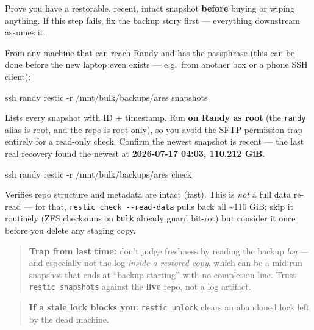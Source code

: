 \documentclass[
]{article}
\newenvironment{Shaded}{\begin{snugshade}}{\end{snugshade}}
\newcommand{\FunctionTok}[1]{\textcolor[rgb]{0.00,0.00,0.00}{#1}}
\newcommand{\NormalTok}[1]{#1}
\newcommand{\StringTok}[1]{\textcolor[rgb]{0.31,0.60,0.02}{#1}}
\begin{document}
Prove you have a restorable, recent, intact snapshot \textbf{before}
buying or wiping anything. If this step fails, fix the backup story
first --- everything downstream assumes it.

From any machine that can reach Randy and has the passphrase (this can
be done before the new laptop even exists --- e.g.~from another box or a
phone SSH client):

\begin{Shaded}
\begin{Highlighting}[]
\FunctionTok{ssh}\NormalTok{ randy }\StringTok{\textquotesingle{}restic {-}r /mnt/bulk/backups/ares snapshots\textquotesingle{}}
\end{Highlighting}
\end{Shaded}

Lists every snapshot with ID + timestamp. Run \textbf{on Randy as root}
(the \texttt{randy} alias is root, and the repo is root-only), so you
avoid the SFTP permission trap entirely for a read-only check. Confirm
the newest snapshot is recent --- the last real recovery found the
newest at \textbf{2026-07-17 04:03, 110.212 GiB}.

\begin{Shaded}
\begin{Highlighting}[]
\FunctionTok{ssh}\NormalTok{ randy }\StringTok{\textquotesingle{}restic {-}r /mnt/bulk/backups/ares check\textquotesingle{}}
\end{Highlighting}
\end{Shaded}

Verifies repo structure and metadata are intact (fast). This is
\emph{not} a full data re-read --- for that,
\texttt{restic\ check\ -\/-read-data} pulls back all \textasciitilde110
GiB; skip it routinely (ZFS checksums on \texttt{bulk} already guard
bit-rot) but consider it once before you delete any staging copy.

\begin{quote}
\textbf{Trap from last time:} don't judge freshness by reading the
backup \emph{log} --- and especially not the log \emph{inside a restored
copy}, which can be a mid-run snapshot that ends at ``backup starting''
with no completion line. Trust \texttt{restic\ snapshots} against the
\textbf{live} repo, not a log artifact.
\end{quote}

\begin{quote}
\textbf{If a stale lock blocks you:} \texttt{restic\ unlock} clears an
abandoned lock left by the dead machine.
\end{quote}
\end{document}
